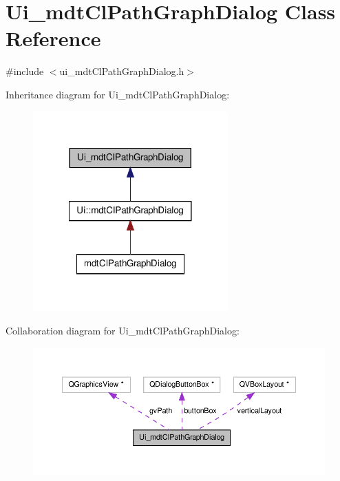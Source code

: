 \hypertarget{class_ui__mdt_cl_path_graph_dialog}{\section{Ui\-\_\-mdt\-Cl\-Path\-Graph\-Dialog Class Reference}
\label{class_ui__mdt_cl_path_graph_dialog}
}


{\ttfamily \#include $<$ui\-\_\-mdt\-Cl\-Path\-Graph\-Dialog.\-h$>$}



Inheritance diagram for Ui\-\_\-mdt\-Cl\-Path\-Graph\-Dialog\-:\nopagebreak
\begin{figure}[H]
\begin{center}
\leavevmode
\includegraphics[width=212pt]{class_ui__mdt_cl_path_graph_dialog__inherit__graph}
\end{center}
\end{figure}


Collaboration diagram for Ui\-\_\-mdt\-Cl\-Path\-Graph\-Dialog\-:\nopagebreak
\begin{figure}[H]
\begin{center}
\leavevmode
\includegraphics[width=350pt]{class_ui__mdt_cl_path_graph_dialog__coll__graph}
\end{center}
\end{figure}
